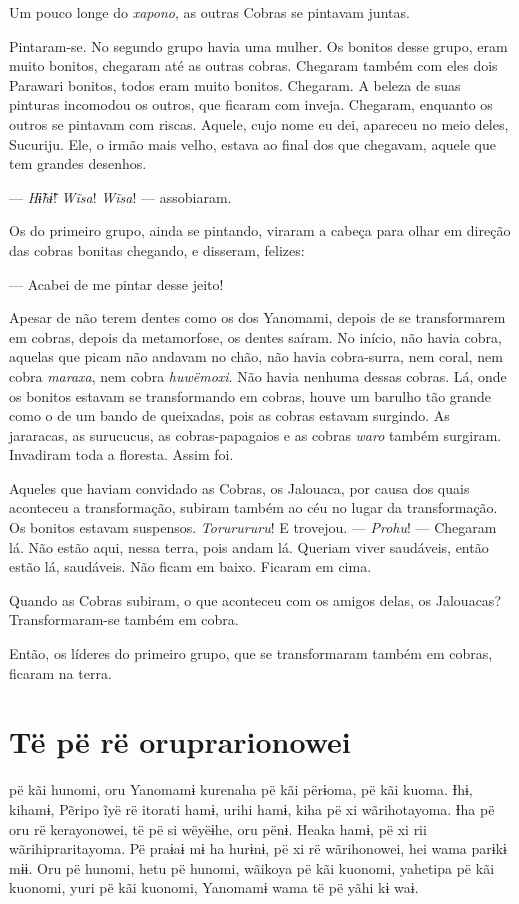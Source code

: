 Um pouco longe do \textit{xapono}, as outras Cobras se pintavam juntas.

Pintaram-se. No segundo grupo havia uma mulher. Os bonitos desse
grupo, eram muito bonitos, chegaram até as outras cobras. Chegaram
também com eles dois Parawari bonitos, todos eram muito bonitos.
Chegaram. A beleza de suas pinturas incomodou os outros, que ficaram com
inveja. Chegaram, enquanto os outros se pintavam com riscas. Aquele,
cujo nome eu dei, apareceu no meio deles, Sucuriju. Ele, o irmão mais
velho, estava ao final dos que chegavam, aquele que tem grandes
desenhos.

--- \textit{Hɨ̃hɨ̃}! \textit{Wĩsa}! \textit{Wĩsa}! --- assobiaram. 

Os do primeiro grupo, ainda se pintando, viraram a cabeça para olhar em
direção das cobras bonitas chegando, e disseram, felizes:

--- Acabei de me pintar desse jeito! 

Apesar de não terem dentes como os dos Yanomami, depois de se
transformarem em cobras, depois da metamorfose, os dentes saíram. No
início, não havia cobra, aquelas que picam não andavam no chão, não
havia cobra-surra, nem coral, nem cobra \textit{maraxa}, nem
cobra \textit{huwëmoxi}. Não havia nenhuma dessas cobras. Lá, onde os
bonitos estavam se transformando em cobras, houve um barulho tão grande
como o de um bando de queixadas, pois as cobras estavam surgindo. As
jararacas, as surucucus, as cobras-papagaios e as
cobras \textit{waro} também surgiram. Invadiram toda a floresta. Assim foi. 

Aqueles que haviam convidado as Cobras, os Jalouaca, por causa dos quais
aconteceu a transformação, subiram também ao céu no lugar da
transformação. Os bonitos estavam suspensos. \textit{Torurururu}! E
trovejou. --- \textit{Prohu}! --- Chegaram lá. Não estão aqui, nessa terra,
pois andam lá. Queriam viver saudáveis, então estão lá, saudáveis. Não
ficam em baixo. Ficaram em cima. 

Quando as Cobras subiram, o que aconteceu com os amigos delas, os
Jalouacas? Transformaram-se também em cobra. 

Então, os líderes do primeiro grupo, que se transformaram também
em cobras, ficaram na terra.

\chapter{Të pë rë oruprarionowei}
 
 pë kãi hunomi, oru Yanomamɨ kurenaha pë kãi përɨoma, pë kãi kuoma.
Ɨhɨ, kihamɨ, Pẽripo ĩyë rë itorati hamɨ, urihi hamɨ, kiha pë xi
wãrihotayoma. Ɨha pë oru rë kerayonowei, të pë si wëyëɨhe, oru pënɨ.
Heaka hamɨ, pë xi rii wãrihipraritayoma. Pë praɨaɨ mɨ ha hurɨnɨ, pë xi
rë wãrihonowei, hei wama parɨkɨ mɨɨ. Oru pë hunomi, hetu pë hunomi,
wãikoya pë kãi kuonomi, yahetipa pë kãi kuonomi, yuri pë kãi kuonomi,
Yanomamɨ wama të pë yãhi kɨ waɨ. 

